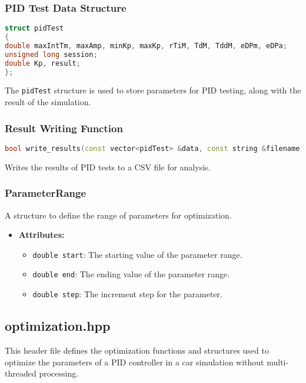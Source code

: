 \documentclass[a4paper,12pt]{report}
\begin{document}
\subsubsection{PID Test Data Structure}
\begin{lstlisting}[language=cpp]
struct pidTest
{
double maxIntTm, maxAmp, minKp, maxKp, rTiM, TdM, TddM, eDPm, eDPa;
unsigned long session;
double Kp, result;
};
\end{lstlisting}
The \texttt{pidTest} structure is used to store parameters for PID testing, along with the result of the simulation.
\subsubsection{Result Writing Function}
\begin{lstlisting}[language=cpp]
bool write_results(const vector<pidTest> &data, const string &filename)
\end{lstlisting}
Writes the results of PID tests to a CSV file for analysis.
\subsubsection{ParameterRange}
A structure to define the range of parameters for optimization.
\begin{itemize}
\item \textbf{Attributes:}
\begin{itemize}
\item \texttt{double start}: The starting value of the parameter range.
\item \texttt{double end}: The ending value of the parameter range.
\item \texttt{double step}: The increment step for the parameter.
\end{itemize}
\end{itemize}
\subsection{optimization.hpp}
This header file defines the optimization functions and structures used to optimize the parameters of a PID controller in a car simulation without multi-threaded processing.
\end{document}
